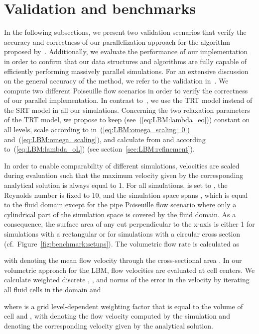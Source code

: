 \documentclass[final,leqno,onefignum,onetabnum]{siamltex1213}
\begin{document}
\section{Validation and benchmarks}\label{sec:benchmarks}

In the following subsections, we present two validation scenarios that verify the accuracy and correctness of our parallelization approach for the algorithm proposed by~\cite{Rohde2006}.
Additionally, we evaluate the performance of our implementation in order to
confirm that our data structures and algorithms are fully capable of efficiently performing massively parallel simulations.
For an extensive discussion on the general accuracy of the method, we refer to the validation in~\cite{Rohde2006}.
We compute two different Poiseuille flow scenarios
in order to verify the correctness of our parallel implementation.
In contrast to~\cite{Rohde2006}, we use the TRT model instead of the SRT model in all our simulations.
Concerning the two relaxation parameters of the TRT model, we propose to keep  (see~(\ref{eq:LBM:lambda_eo})) constant on all levels,
scale  according to  in~(\ref{eq:LBM:omega_scaling_0}) and~(\ref{eq:LBM:omega_scaling}),
and calculate  from  and  according to~(\ref{eq:LBM:lambda_oL}) (see section~\ref{sec:LBM:refinement}).

In order to enable comparability of different simulations,
velocities are scaled during evaluation such that the maximum velocity given by the corresponding analytical solution is always equal to 1.
For all simulations,  is set to , the Reynolds number is fixed to 10,
and the simulation space spans , which is equal to the fluid domain
except for the pipe Poiseuille flow scenario where only a cylindrical part of the simulation space is covered by the fluid domain.
As a consequence, the surface area of any cut perpendicular to the x-axis is either 1 for simulations with a rectangular or  for simulations with a circular cross section (cf.\ Figure~\ref{fig:benchmark:setups}).
The volumetric flow rate  is calculated as

with  denoting the mean flow velocity through the cross-sectional area .
In our volumetric approach for the LBM, flow velocities are evaluated at cell centers.
We calculate weighted discrete , , and  norms of the error in the velocity by iterating all fluid cells in the domain  and

where  is a grid level-dependent weighting factor that is equal to the volume of cell  and ,
with  denoting the flow velocity computed by the simulation and
 denoting the corresponding velocity given by the analytical solution.
\end{document}
